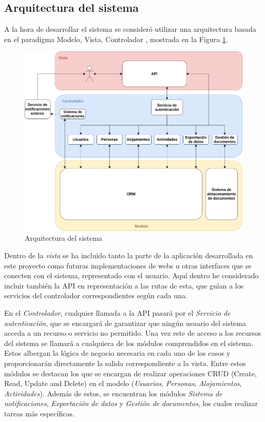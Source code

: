 \subsection{Arquitectura del sistema}
\label{sec:arq}

A la hora de desarrollar el sistema se consideró utilizar una arquitectura basada en el paradigma Modelo, Vista, Controlador \cite{mvc}, mostrada en la Figura \ref{fig:arq}. 

\begin{figure}[H]
    \centering
    \includegraphics[width=\textwidth]{diseno/sistema/Arquitectura.png}
    \caption{Arquitectura del sistema}
    \label{fig:arq}
\end{figure}

Dentro de la \textit{vista} se ha incluido tanto la parte de la aplicación desarrollada en este proyecto como futuras implementaciones de webs u otras interfaces que se conecten con el sistema, representado con el usuario. Aquí dentro he considerado incluir también la API en representación a las rutas de esta, que guían a los servicios del controlador correspondientes según cada una. 

En el \textit{Controlador}, cualquier llamada a la API pasará por el \textit{Servicio de autenticación}, que se encargará de garantizar que ningún usuario del sistema acceda a un recurso o servicio no permitido. Una vez este de acceso a los recursos del sistema se llamará a cualquiera de los módulos comprendidos en el sistema. Estos albergan la lógica de negocio necesaria en cada uno de los casos y proporcionarán directamente la salida correspondiente a la vista. Entre estos módulos se destacan los que se encargan de realizar operaciones CRUD (Create, Read, Update and Delete) en el modelo (\textit{Usuarios}, \textit{Personas}, \textit{Alojamientos}, \textit{Actividades}). Además de estos, se encuentran los módulos \textit{Sistema de notificaciones}, \textit{Exportación de datos} y \textit{Gestión de documentos}, los cuales realizar tareas más específicas.

